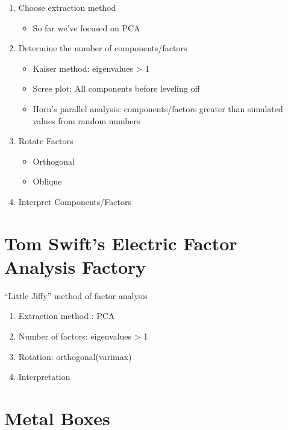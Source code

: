 \documentclass[
]{book}
\providecommand{\tightlist}{%
  \setlength{\itemsep}{0pt}\setlength{\parskip}{0pt}}
\begin{document}
\begin{enumerate}
\def\labelenumi{\arabic{enumi}.}
\tightlist
\item
  Choose extraction method

  \begin{itemize}
  \tightlist
  \item
    So far we've focused on PCA
  \end{itemize}
\item
  Determine the number of components/factors

  \begin{itemize}
  \tightlist
  \item
    Kaiser method: eigenvalues \textgreater{} 1
  \item
    Scree plot: All components before leveling off
  \item
    Horn's parallel analysis: components/factors greater than simulated values from random numbers
  \end{itemize}
\item
  Rotate Factors

  \begin{itemize}
  \tightlist
  \item
    Orthogonal
  \item
    Oblique
  \end{itemize}
\item
  Interpret Components/Factors
\end{enumerate}

\hypertarget{tom-swifts-electric-factor-analysis-factory}{%
\section{Tom Swift's Electric Factor Analysis Factory}\label{tom-swifts-electric-factor-analysis-factory}}

``Little Jiffy'' method of factor analysis

\begin{enumerate}
\def\labelenumi{\arabic{enumi}.}
\tightlist
\item
  Extraction method : PCA
\item
  Number of factors: eigenvalues \textgreater{} 1
\item
  Rotation: orthogonal(varimax)
\item
  Interpretation
\end{enumerate}

\hypertarget{metal-boxes}{%
\section{Metal Boxes}\label{metal-boxes}}
\end{document}

